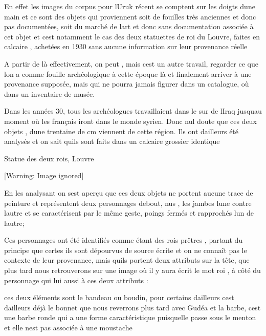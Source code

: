 \documentclass{article}
\begin{document}
En effet les images du corpus pour l{\textquotesingle}Uruk récent se
comptent sur les doigts d{\textquotesingle}une main et ce sont des
objets qui proviennent soit de fouilles très anciennes et donc pas
documentées, soit du marché de l{\textquotesingle}art et donc sans
documentation associée à cet objet et c{\textquotesingle}est notamment
le cas des deux statuettes de roi du Louvre, faites en calcaire ,
achetées en 1930 sans aucune information sur leur provenance réelle

A partir de là effectivement, on peut , mais c{\textquotesingle}est un
autre travail, regarder ce que l{\textquotesingle}on a comme fouille
archéologique à cette époque là et finalement arriver à une provenance
supposée, mais qui ne pourra jamais figurer dans un catalogue, où dans
un inventaire de musée.

Dans les années 30, tous les archéologues travaillaient dans le sur de
l{\textquotesingle}Iraq jusqu{\textquotesingle}au moment où les
français iront dans le monde syrien. Donc nul doute que ces deux objets
, d{\textquotesingle}une trentaine de cm viennent de cette région. Ils
ont d{\textquotesingle}ailleurs été analysés et on sait
qu{\textquotesingle}ils sont faits dans un calcaire grossier identique

Statue des deux rois, Louvre

  [Warning: Image ignored] %
 

En les analysant on s{\textquotesingle}est aperçu que ces deux objets ne
portent aucune trace de peinture et représentent deux personnages
debout, nus , les jambes l{\textquotesingle}une contre
l{\textquotesingle}autre et se caractérisent par le même geste,  poings
fermés et rapprochés l{\textquotesingle}un de l{\textquotesingle}autre;


Ces personnages ont été identifiés comme étant des rois prêtres ,
partant du principe que certes ils sont dépourvus de source écrite et
on ne connaît pas le contexte de leur provenance, mais
qu{\textquotesingle}ils portent deux attributs sur la tête, que plus
tard nous retrouverons sur une image où il y aura écrit le mot roi , à
côté du personnage qui lui aussi à ces deux attributs : 

ces deux éléments sont le bandeau ou boudin, pour certains
d{\textquotesingle}ailleurs c{\textquotesingle}est
d{\textquotesingle}ailleurs déjà le bonnet que nous reverrons plus tard
avec Gudéa et la barbe, c{\textquotesingle}est une barbe ronde qui a
une forme caractéristique puisqu{\textquotesingle}elle passe sous le
menton et elle n{\textquotesingle}est pas associée à une moustache
\end{document}
